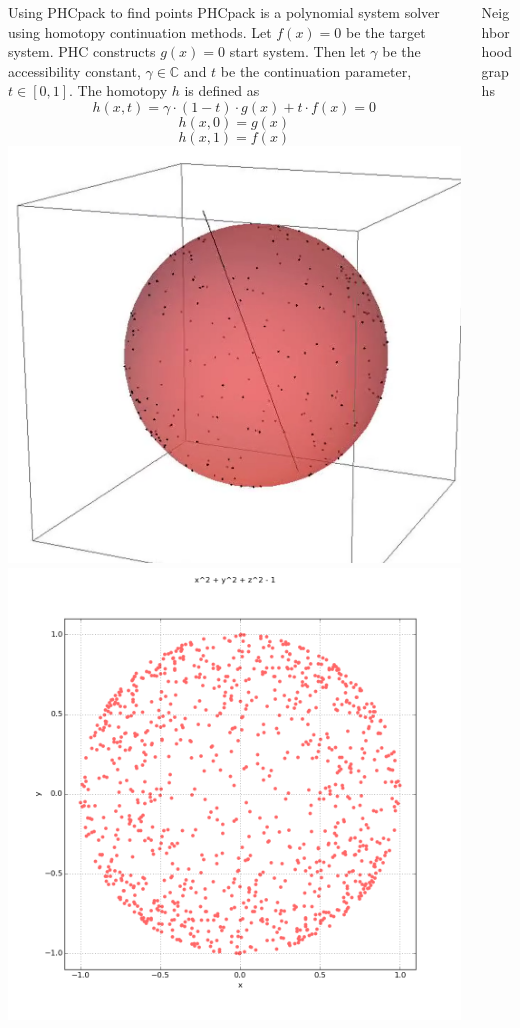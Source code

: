 \documentclass{beamer}
\def\C{\mathbb C}
\begin{document}
\begin{frame}{}
\begin{columns}[t]
\begin{column}{0.32\linewidth}
\begin{block}{Using PHCpack to find points}
PHCpack is a polynomial system solver using homotopy continuation methods. Let $f(x) = 0$ be the target system. PHC constructs $g(x)=0$ start system. Then let $\gamma$ be the accessibility constant, $\gamma \in \C$ and $t$ be the continuation parameter, $t \in [0,1]$. The homotopy $h$ is defined as
\begin{equation*}
h(x,t) = \gamma \cdot (1-t)\cdot g(x) + t \cdot f(x) = 0
\end{equation*}
\begin{equation*}
h(x, 0) =g(x)
\end{equation*}
\begin{equation*}
h(x, 1) = f(x)
\end{equation*}
\includegraphics[width=.5\columnwidth]{sphere}
\includegraphics[width=.5\columnwidth]{plot2d_9}


\end{block}


\end{column}%

\begin{column}{0.32\linewidth}

\begin{block}{Neighborhood graphs}


\end{block}
\end{column}
\end{columns}
\end{frame}
\end{document}
